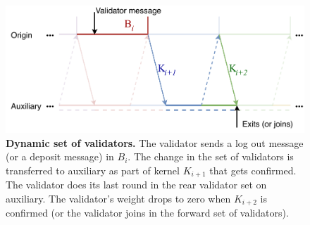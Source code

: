 \documentclass[12pt,a4paper]{article}
\newcommand{\B}{\mathcal{B}}
\newcommand{\BS}{\operatorname{BS}}
\newcommand{\BE}{\operatorname{BE}}
\begin{document}
\begin{figure}[htb]
    \centering
	\includegraphics[width=\textwidth]{dynamic_validators}
	\caption{\textbf{Dynamic set of validators.}
		The validator sends a log out message (or a deposit message) in $B_i$.
		The change in the set of validators is transferred to auxiliary as part of kernel $K_{i+1}$ that gets confirmed.
		The validator does its last round in the rear validator set on auxiliary.
		The validator's weight drops to zero when $K_{i+2}$ is confirmed (or the validator joins in the forward set of validators).
	}
	\label{fig:dynamic_validators}
\end{figure}




\end{document}
